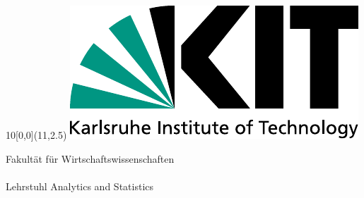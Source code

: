 
\newcommand{\diameter}{20}
\newcommand{\xone}{-15}
\newcommand{\xtwo}{160}
\newcommand{\yone}{15}
\newcommand{\ytwo}{-253}

\begin{titlepage}
	\begin{textblock}{10}[0,0](11,2.5)
		\includegraphics[width=.48\textwidth]{logos/KITLogo_EN_RGB.pdf}	\end{textblock}
	\vspace*{3.5cm}
	\begin{center}
		\Large{
			Fakultät für Wirtschaftswissenschaften\\
			\myinstitute \\
			Lehrstuhl Analytics and Statistics \\
		}
	    \vspace*{2cm}
		\Huge{\mytitle}
		\vspace*{2cm}\\
		\Large{
			\mytype
		}\\
		\vspace*{1cm}
		\huge{\myname}\\
			\Large{\matricle}\\
		\vspace*{1cm}
	\end{center}
	\vspace*{1.5cm}
\Large{
\begin{center}

\end{center}}
\end{titlepage}
